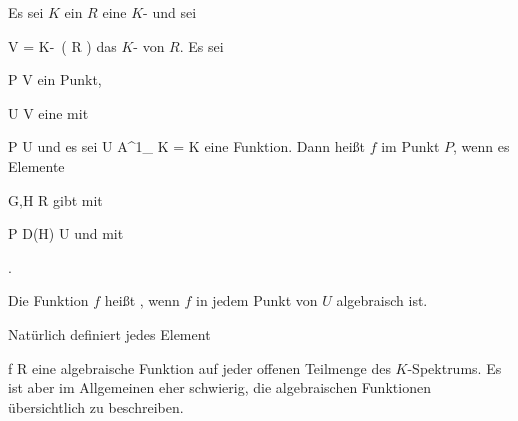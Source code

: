 {}
{





Es sei $K$ ein
$R$ eine
$K$-
und sei

\mavergleichskette
{\vergleichskette
{ V
}
{ = }{ K\!-\!\, \left(  R  \right)
}
{  }{
}
{    }{
}
{   }{
}
}
{}{}{}
das
$K$-
von $R$. Es sei

\mavergleichskette
{\vergleichskette
{ P
}
{ \in }{ V
}
{  }{
}
{    }{
}
{   }{
}
}
{}{}{}
ein Punkt,

\mavergleichskette
{\vergleichskette
{ U
}
{ \subseteq }{ V
}
{  }{
}
{    }{
}
{   }{
}
}
{}{}{}
eine
mit

\mavergleichskette
{\vergleichskette
{ P
}
{ \in }{ U
}
{  }{
}
{    }{
}
{   }{
}
}
{}{}{}
und es sei
 { U } { {\mathbb A}^{1}_{ K } = K
} {}
eine Funktion. Dann heißt $f$ 
 {} {}
im Punkt $P$, wenn es Elemente

\mavergleichskette
{\vergleichskette
{ G,H
}
{ \in }{ R
}
{  }{
}
{    }{
}
{   }{
}
}
{}{}{}
gibt mit

\mavergleichskette
{\vergleichskette
{ P
}
{ \in }{ D(H)
}
{ \subseteq }{ U
}
{    }{
}
{   }{
}
}
{}{}{}
und mit

 { . }

Die Funktion $f$ heißt 
 {} {,}
wenn $f$ in jedem Punkt von $U$ algebraisch ist.





}

Natürlich definiert jedes Element

\mavergleichskette
{\vergleichskette
{ f
}
{ \in }{ R
}
{  }{
}
{    }{
}
{   }{
}
}
{}{}{}
eine algebraische Funktion auf jeder offenen Teilmenge des $K$-Spektrums. Es ist aber im Allgemeinen eher schwierig, die algebraischen Funktionen übersichtlich zu beschreiben.

